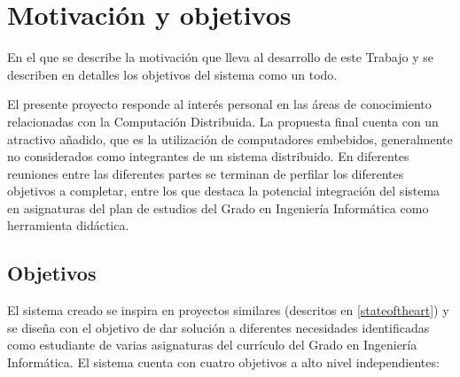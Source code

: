 \chapter{Motivación y objetivos}

\begin{cabstract}
En el que se describe la motivación que lleva al desarrollo de este Trabajo y se describen en detalles los objetivos del sistema como un todo.
\end{cabstract}

El presente proyecto responde al interés personal en las áreas de conocimiento relacionadas con la Computación Distribuida. La propuesta final cuenta con un atractivo añadido, que es la utilización de computadores embebidos, generalmente no considerados como integrantes de un sistema distribuido. En diferentes reuniones entre las diferentes partes se terminan de perfilar los diferentes objetivos a completar, entre los que destaca la potencial integración del sistema en asignaturas del plan de estudios del Grado en Ingeniería Informática como herramienta didáctica.

\section{Objetivos}
\label{objetivos}
El sistema creado se inspira en proyectos similares (descritos en \ref{stateoftheart}) y se diseña con el objetivo de dar solución a diferentes necesidades identificadas como estudiante de varias asignaturas del currículo del Grado en Ingeniería Informática. El sistema cuenta con cuatro objetivos a alto nivel independientes:

